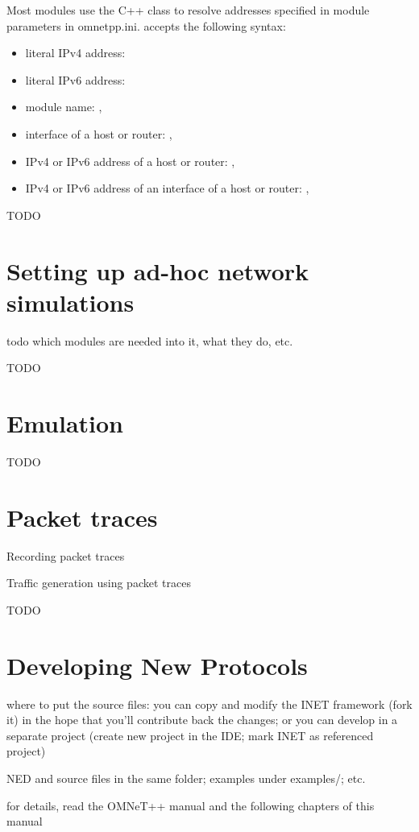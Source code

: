 Most modules use the  C++ class to resolve addresses
specified in module parameters in omnetpp.ini.
 accepts the following syntax:

\begin{itemize}
  \item literal IPv4 address: 
  \item literal IPv6 address: 
  \item module name: , 
  \item interface of a host or router: , 
  \item IPv4 or IPv6 address of a host or router: ,
  \item IPv4 or IPv6 address of an interface of a host or router:
      , 
\end{itemize}


\ifdraft TODO
\section{Setting up ad-hoc network simulations}

todo which modules are needed into it, what they do, etc.
\fi

\ifdraft TODO
\section{Emulation}
\fi

\ifdraft TODO
\section{Packet traces}

Recording packet traces

Traffic generation using packet traces
\fi

\ifdraft TODO
\section{Developing New Protocols}

where to put the source files: you can copy and modify the INET framework (fork it)
in the hope that you'll contribute back the changes; or you can develop in
a separate project (create new project in the IDE; mark INET as referenced project)

NED and source files in the same folder; examples under examples/; etc.

for details, read the OMNeT++ manual and the following chapters of this manual

\fi




